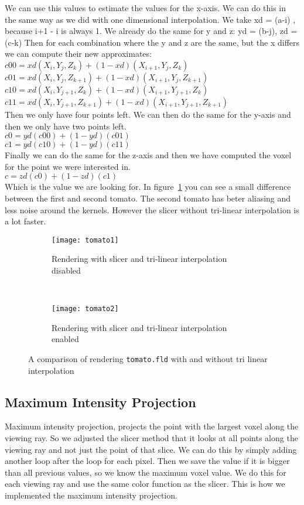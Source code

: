 We can use this values to estimate the values for the x-axis. 
We can do this in the same way as we did with one dimensional interpolation. 
We take xd = (a-i) , because i+1 - i is always 1.
We already do the same for y and z: yd = (b-j), zd = (c-k) 
Then for each combination where the y and z are the same, but the x differs we can compute their new approximates: \\
$c00 = xd(X_{i},Y_{j},Z_{k})+(1-xd)(X_{i+1},Y_{j},Z_{k})$ \\
$c01 = xd(X_{i},Y_{j},Z_{k+1})+(1-xd)(X_{i+1},Y_{j},Z_{k+1})$ \\
$c10 = xd(X_{i},Y_{j+1},Z_{k})+(1-xd)(X_{i+1},Y_{j+1},Z_{k})$ \\
$c11 = xd(X_{i},Y_{j+1},Z_{k+1})+(1-xd)(X_{i+1},Y_{j+1},Z_{k+1})$ \\
Then we only have four points left. We can then do the same for the y-axis and then we only have two points left. \\
$c0= yd(c00)+(1-yd)(c01)$\\
$c1= yd(c10)+(1-yd)(c11)$\\
Finally we can do the same for the z-axis and then we have computed the voxel for the point we were interested in.\\
$c= zd(c0)+(1-zd)(c1)$\\
Which is the value we are looking for. 
In figure~\ref{fig:interpolation} you can see a small difference between the first and second tomato.
The second tomato has beter aliasing and less noise around the kernels. 
However the slicer without tri-linear interpolation is a lot faster. 

\begin{figure}[H]
	\centering
	\begin{subfigure}[t]{0.45\textwidth}
		\texttt{[image: tomato1]}
		\caption{Rendering with slicer and tri-linear interpolation disabled}
	\end{subfigure}
	~%
	\begin{subfigure}[t]{0.45\textwidth}
		\texttt{[image: tomato2]}
		\caption{Rendering with slicer and tri-linear interpolation enabled}
	\end{subfigure}
	\caption{A comparison of rendering \texttt{tomato.fld} with and without tri linear interpolation}
	\label{fig:interpolation}
\end{figure}

\subsection{Maximum Intensity Projection}
Maximum intensity projection, projects the point with the largest voxel along the viewing ray. 
So we adjusted the slicer method that it looks at all points along the viewing ray and not just the point of that slice. 
We can do this by simply adding another loop after the loop for each pixel. 
Then we save the value if it is bigger than all previous values, so we know the maximum voxel value.
We do this for each viewing ray and use the same color function as the slicer. 
This is how we implemented the maximum intensity projection.

